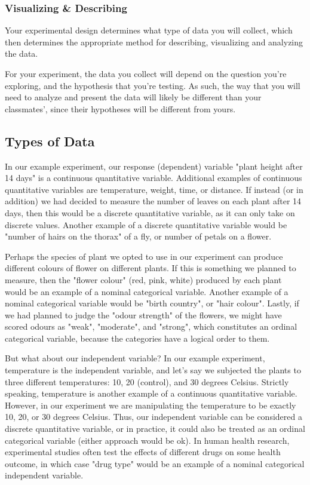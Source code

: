 \documentclass[
]{book}
\begin{document}
\hypertarget{visualizing-describing}{%
\subsubsection*{Visualizing \& Describing}\label{visualizing-describing}}

Your experimental design determines what type of data you will collect, which then determines the appropriate method for describing, visualizing and analyzing the data.

For your experiment, the data you collect will depend on the question you're exploring, and the hypothesis that you're testing. As such, the way that you will need to analyze and present the data will likely be different than your classmates', since their hypotheses will be different from yours.

\hypertarget{types-of-data}{%
\subsection*{Types of Data}\label{types-of-data}}

In our example experiment, our response (dependent) variable "plant height after 14 days" is a continuous quantitative variable. Additional examples of continuous quantitative variables are temperature, weight, time, or distance. If instead (or in addition) we had decided to measure the number of leaves on each plant after 14 days, then this would be a discrete quantitative variable, as it can only take on discrete values. Another example of a discrete quantitative variable would be "number of hairs on the thorax" of a fly, or number of petals on a flower.

Perhaps the species of plant we opted to use in our experiment can produce different colours of flower on different plants. If this is something we planned to measure, then the "flower colour" (red, pink, white) produced by each plant would be an example of a nominal categorical variable. Another example of a nominal categorical variable would be "birth country", or "hair colour". Lastly, if we had planned to judge the "odour strength" of the flowers, we might have scored odours as "weak", "moderate", and "strong", which constitutes an ordinal categorical variable, because the categories have a logical order to them.

But what about our independent variable? In our example experiment, temperature is the independent variable, and let's say we subjected the plants to three different temperatures: 10, 20 (control), and 30 degrees Celsius. Strictly speaking, temperature is another example of a continuous quantitative variable. However, in our experiment we are manipulating the temperature to be exactly 10, 20, or 30 degrees Celsius. Thus, our independent variable can be considered a discrete quantitative variable, or in practice, it could also be treated as an ordinal categorical variable (either approach would be ok). In human health research, experimental studies often test the effects of different drugs on some health outcome, in which case "drug type" would be an example of a nominal categorical independent variable.
\end{document}
